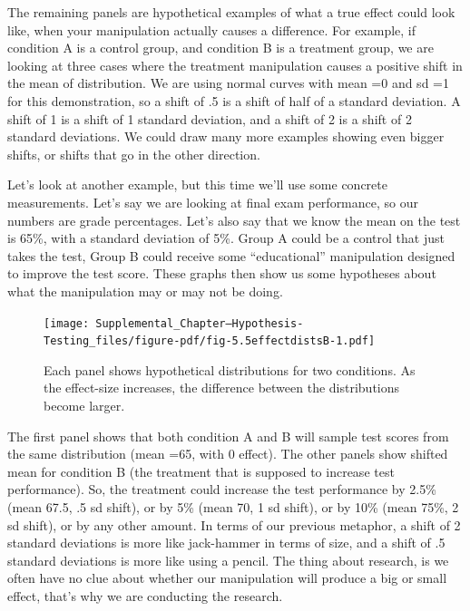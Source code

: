 \documentclass[
  letterpaper,
  DIV=11,
  numbers=noendperiod]{scrartcl}
\begin{document}
The remaining panels are hypothetical examples of what a true effect
could look like, when your manipulation actually causes a difference.
For example, if condition A is a control group, and condition B is a
treatment group, we are looking at three cases where the treatment
manipulation causes a positive shift in the mean of distribution. We are
using normal curves with mean =0 and sd =1 for this demonstration, so a
shift of .5 is a shift of half of a standard deviation. A shift of 1 is
a shift of 1 standard deviation, and a shift of 2 is a shift of 2
standard deviations. We could draw many more examples showing even
bigger shifts, or shifts that go in the other direction.

Let's look at another example, but this time we'll use some concrete
measurements. Let's say we are looking at final exam performance, so our
numbers are grade percentages. Let's also say that we know the mean on
the test is 65\%, with a standard deviation of 5\%. Group A could be a
control that just takes the test, Group B could receive some
``educational'' manipulation designed to improve the test score. These
graphs then show us some hypotheses about what the manipulation may or
may not be doing.

\begin{figure}

{\centering \texttt{[image: Supplemental\_Chapter---Hypothesis-Testing\_files/figure-pdf/fig-5.5effectdistsB-1.pdf]}

}

\caption{\label{fig-5.5effectdistsB}Each panel shows hypothetical
distributions for two conditions. As the effect-size increases, the
difference between the distributions become larger.}

\end{figure}

The first panel shows that both condition A and B will sample test
scores from the same distribution (mean =65, with 0 effect). The other
panels show shifted mean for condition B (the treatment that is supposed
to increase test performance). So, the treatment could increase the test
performance by 2.5\% (mean 67.5, .5 sd shift), or by 5\% (mean 70, 1 sd
shift), or by 10\% (mean 75\%, 2 sd shift), or by any other amount. In
terms of our previous metaphor, a shift of 2 standard deviations is more
like jack-hammer in terms of size, and a shift of .5 standard deviations
is more like using a pencil. The thing about research, is we often have
no clue about whether our manipulation will produce a big or small
effect, that's why we are conducting the research.
\end{document}
